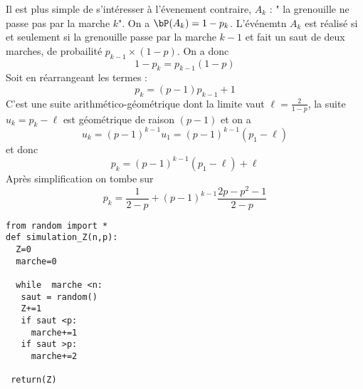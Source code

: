 \begin{correction}
\begin{enumerate}
Il est plus simple de s'intéresser à l'évenement contraire,  $A_k$ : " la grenouille ne passe pas par la marche $k$". On  a $\bP(A_k) =1-p_k$. L'événemtn $A_k$ est réalisé si et seulement si la grenouille passe par la marche $k-1$  et fait un saut de deux marches, de probailité $p_{k-1} \times (1-p)$. 
On  a donc 
$$1- p_k = p_{k-1} (1-p)$$
Soit en réarrangeant les termes : 
$$p_k = (p-1) p_{k-1} +1$$
C'est une suite arithmético-géométrique dont la limite vaut $\ell=\frac{2}{1-p}$, la suite 
$u_k = p_k -\ell $ est géométrique de raison $(p-1)$ et on  a
$$u_k =(p-1)^{k-1}  u_1 = (p-1)^{k-1} (p_1-\ell) $$
et donc 
$$p_k =  (p-1)^{k-1} (p_1-\ell) +\ell$$
Après simplification on tombe sur
$$p_k = \frac{1}{2-p} +(p-1)^{k-1}  \frac{2p-p^2 -1}{2-p}$$

\begin{lstlisting}
from random import *
def simulation_Z(n,p):
  Z=0
  marche=0

  while  marche <n:
   saut = random()
   Z+=1
   if saut <p:
     marche+=1
   if saut >p:
     marche+=2
 
 return(Z)
  	
\end{lstlisting}



\end{enumerate}



\end{correction}